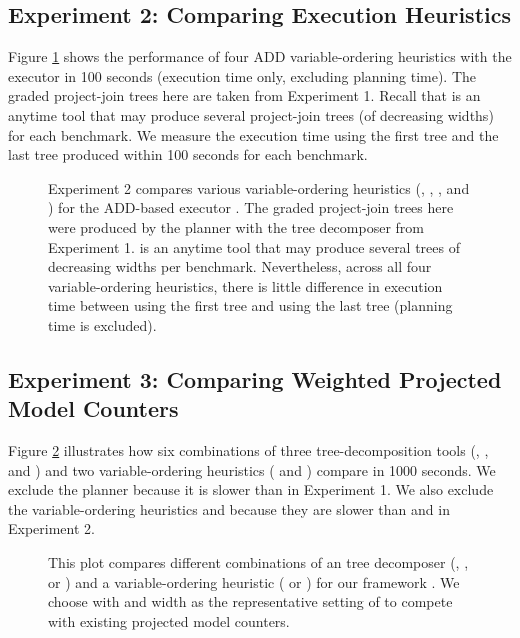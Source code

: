 
\subsection{Experiment 2: Comparing Execution Heuristics}

Figure \ref{figExecutionA} shows the performance of four ADD variable-ordering heuristics with the executor \dmc{} in 100 seconds (execution time only, excluding planning time).
The graded project-join trees here are taken from Experiment 1.
Recall that \Lg{} is an anytime tool that may produce several project-join trees (of decreasing widths) for each benchmark.
We measure the execution time using the first tree and the last tree produced within 100 seconds for each benchmark.
\begin{figure}[H]
    \centering
    
    \caption{
        Experiment 2 compares various variable-ordering heuristics (\mcs{}, \lexp, \lexm, and \minfill{}) for the ADD-based executor \dmc.
        The graded project-join trees here were produced by the planner \Lg{} with the tree decomposer \flowcutter{} from Experiment 1.
        \Lg{} is an anytime tool that may produce several trees of decreasing widths per benchmark.
        Nevertheless, across all four variable-ordering heuristics, there is little difference in execution time between using the first tree and using the last tree (planning time is excluded).
    }
    \label{figExecutionA}
\end{figure}


\subsection{Experiment 3: Comparing Weighted Projected Model Counters}

Figure \ref{figSolvingA} illustrates how six combinations of three \Lg{} tree-decomposition tools (\flowcutter{}, \htd, and \tamaki) and two \dmc{} variable-ordering heuristics (\mcs{} and \lexp) compare in 1000 seconds.
We exclude the planner \htb{} because it is slower than \Lg{} in Experiment 1.
We also exclude the variable-ordering heuristics \lexm{} and \minfill{} because they are slower than \mcs{} and \lexp{} in Experiment 2.
\begin{figure}[H]
    \centering
    
    \caption{
        This plot compares different combinations of an \Lg{} tree decomposer (\flowcutter{}, \htd{}, or \tamaki{}) and a \dmc{} variable-ordering heuristic (\mcs{} or \lexp) for our framework \procount.
        We choose \Lg{} with \flowcutter{} and \dmc{} width \mcs{} as the representative setting of \procount{} to compete with existing projected model counters.
    }
    \label{figSolvingA}
\end{figure}

